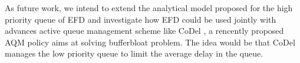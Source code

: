 \documentclass[preprint,12pt]{elsarticle}
\begin{document}
As future work, we intend to extend the analytical model proposed for the high priority queue of EFD and investigate how EFD could be used jointly with advances active queue management scheme like CoDel \cite{Jacobson12}, a rencently proposed AQM policy aims at solving bufferbloat problem. The idea would be that CoDel manages the low priority queue to limit the average delay in the queue.














\end{document}
